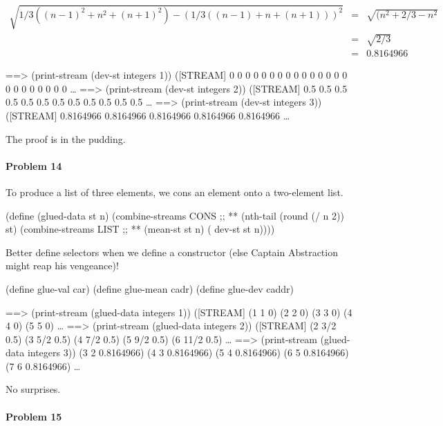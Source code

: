 \begin{eqnarray*}
\sqrt{1/3((n-1)^2 + n^2 + (n+1)^2) - (1/3((n-1)+n+(n+1)))^2} &=& \sqrt{(n^2+2/3 - n^2} \\
                                                             &=& \sqrt{2/3}            \\
                                                             &=& 0.8164966
\end{eqnarray*}

\beginlisp
==> (print-stream (dev-st integers 1))
([STREAM] 0 0 0 0 0 0 0 0 0 0 0 0 0 0 0 0 0 0 0 0 0 0 0 \ldots
\null
==> (print-stream (dev-st integers 2))
([STREAM] 0.5 0.5 0.5 0.5 0.5 0.5 0.5 0.5 0.5 0.5 0.5 0.5 \ldots
\null
==> (print-stream (dev-st integers 3))
([STREAM] 0.8164966 0.8164966 0.8164966 0.8164966 0.8164966 \ldots
\endlisp

The proof is in the pudding.

\paragraph{Problem 14}

To produce a list of three elements, we cons an element onto a two-element
list.

\beginlisp
(define (glued-data st n)
  (combine-streams CONS                              ;; **
                   (nth-tail (round (/ n 2)) st)
                   (combine-streams LIST             ;; **
                                    (mean-st st n)
                                    ( dev-st st n))))
\endlisp

Better define selectors when we define a constructor (else Captain Abstraction
might reap his vengeance)!

\beginlisp
(define glue-val  car)
(define glue-mean cadr)
(define glue-dev  caddr)
\endlisp

\beginlisp
==> (print-stream (glued-data integers 1))
([STREAM] (1 1 0) (2 2 0) (3 3 0) (4 4 0) (5 5 0) \ldots
\null
==> (print-stream (glued-data integers 2))
([STREAM] (2 3/2 0.5) (3 5/2 0.5) (4 7/2 0.5) (5 9/2 0.5) (6 11/2 0.5) \ldots
\null
==> (print-stream (glued-data integers 3))
(3 2 0.8164966) (4 3 0.8164966) (5 4 0.8164966) (6 5 0.8164966) (7 6 0.8164966) \ldots
\endlisp

No surprises.

\paragraph{Problem 15}

